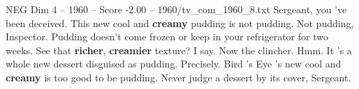 \begin{textsample}{NEG Dim 4 – 1960 – Score -2.00 – 1960/tv\_com\_1960\_8.txt}  \label{ex:f4_neg_083}
Sergeant, you 've been deceived.
This new cool and \textbf{creamy} pudding is not pudding.
Not pudding, Inspector.
Pudding doesn't come frozen or keep in your refrigerator for two weeks.
See that \textbf{richer}, \textbf{creamier} texture?
I say.
Now the clincher.
Hmm.
It 's a whole new dessert disguised as pudding.
Precisely.
Bird 's Eye 's new cool and \textbf{creamy} is too good to be pudding.
Never judge a dessert by its cover, Sergeant.

\end{textsample}

